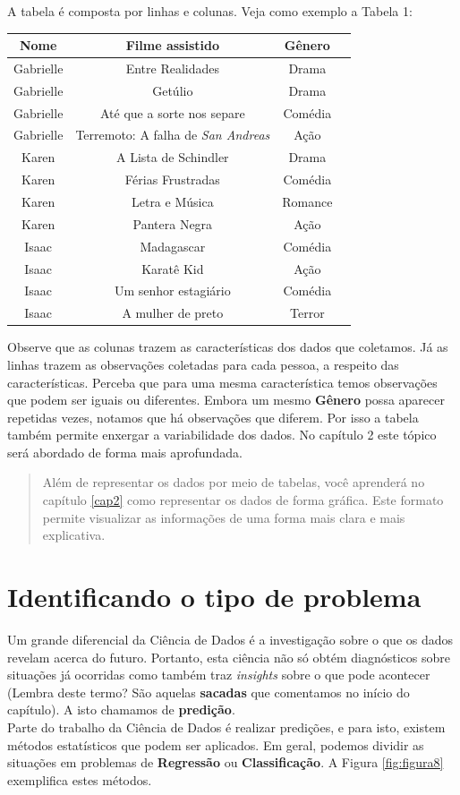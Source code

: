 \documentclass[
  portuguese,
  oneside]{book}
\begin{document}
A tabela é composta por linhas e colunas. Veja como exemplo a Tabela 1:

\begin{longtable}[]{@{}cccc@{}}
\toprule
Nome & Filme assistido & Gênero &\tabularnewline
\midrule
\endhead
Gabrielle & Entre Realidades & Drama &\tabularnewline
Gabrielle & Getúlio & Drama &\tabularnewline
Gabrielle & Até que a sorte nos separe & Comédia &\tabularnewline
Gabrielle & Terremoto: A falha de \emph{San Andreas} & Ação &\tabularnewline
Karen & A Lista de Schindler & Drama &\tabularnewline
Karen & Férias Frustradas & Comédia &\tabularnewline
Karen & Letra e Música & Romance &\tabularnewline
Karen & Pantera Negra & Ação &\tabularnewline
Isaac & Madagascar & Comédia &\tabularnewline
Isaac & Karatê Kid & Ação &\tabularnewline
Isaac & Um senhor estagiário & Comédia &\tabularnewline
Isaac & A mulher de preto & Terror &\tabularnewline
\bottomrule
\end{longtable}

Observe que as colunas trazem as características dos dados que coletamos. Já as linhas trazem as observações coletadas para cada pessoa, a respeito das características. Perceba que para uma mesma característica temos observações que podem ser iguais ou diferentes. Embora um mesmo \textbf{Gênero} possa aparecer repetidas vezes, notamos que há observações que diferem. Por isso a tabela também permite enxergar a variabilidade dos dados. No capítulo 2 este tópico será abordado de forma mais aprofundada.

\begin{quote}
Além de representar os dados por meio de tabelas, você aprenderá no capítulo \ref{cap2} como representar os dados de forma gráfica. Este formato permite visualizar as informações de uma forma mais clara e mais explicativa.
\end{quote}

\hypertarget{identificando-o-tipo-de-problema}{%
\section{Identificando o tipo de problema}\label{identificando-o-tipo-de-problema}}

Um grande diferencial da Ciência de Dados é a investigação sobre o que os dados revelam acerca do futuro. Portanto, esta ciência não só obtém diagnósticos sobre situações já ocorridas como também traz \emph{insights} sobre o que pode acontecer (Lembra deste termo? São aquelas \textbf{sacadas} que comentamos no início do capítulo). A isto chamamos de \textbf{predição}.\\
Parte do trabalho da Ciência de Dados é realizar predições, e para isto, existem métodos estatísticos que podem ser aplicados. Em geral, podemos dividir as situações em problemas de \textbf{Regressão} ou \textbf{Classificação}. A Figura \ref{fig:figura8} exemplifica estes métodos.
\end{document}
